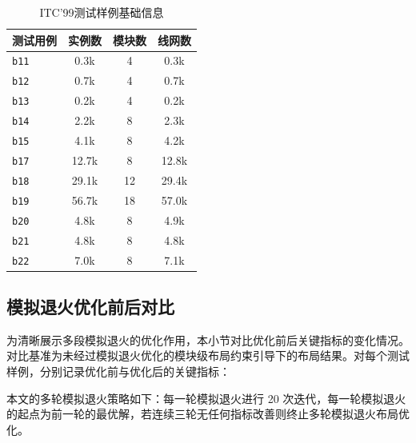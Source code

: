 \begin{table}[!htbp]
    \centering
    \caption{ITC'99测试样例基础信息}
    \label{tab:chap4-itc99-benchmark}
    \small
    \setlength{\tabcolsep}{6pt}
    \renewcommand{\arraystretch}{1.08}
    \begin{tabular}{l c c c}
        \hline
        测试用例 & 实例数 & 模块数 & 线网数 \\
        \hline
        \texttt{b11} & 0.3k & 4  & 0.3k \\
        \texttt{b12} & 0.7k & 4  & 0.7k \\
        \texttt{b13} & 0.2k & 4  & 0.2k \\
        \texttt{b14} & 2.2k & 8  & 2.3k \\
        \texttt{b15} & 4.1k & 8  & 4.2k \\
        \texttt{b17} & 12.7k & 8  & 12.8k \\
        \texttt{b18} & 29.1k & 12 & 29.4k \\
        \texttt{b19} & 56.7k & 18 & 57.0k \\
        \texttt{b20} & 4.8k & 8  & 4.9k \\
        \texttt{b21} & 4.8k & 8  & 4.8k \\
        \texttt{b22} & 7.0k & 8  & 7.1k \\
        \hline
    \end{tabular}
\end{table}

\subsection{模拟退火优化前后对比}
\label{sec:chap4-exp-before-after}

为清晰展示多段模拟退火的优化作用，本小节对比优化前后关键指标的变化情况。对比基准为未经过模拟退火优化的模块级布局约束引导下的布局结果。对每个测试样例，分别记录优化前与优化后的关键指标：

本文的多轮模拟退火策略如下：每一轮模拟退火进行 20 次迭代，每一轮模拟退火的起点为前一轮的最优解，若连续三轮无任何指标改善则终止多轮模拟退火布局优化。

